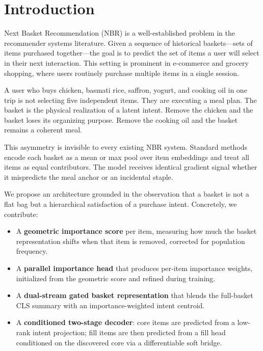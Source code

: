 \documentclass[conference]{IEEEtran}
\begin{document}
\section{Introduction}
Next Basket Recommendation (NBR) is a well-established problem in the recommender systems literature. Given a sequence of historical baskets---sets of items purchased together---the goal is to predict the set of items a user will select in their next interaction. This setting is prominent in e-commerce and grocery shopping, where users routinely purchase multiple items in a single session.

A user who buys chicken, basmati rice, saffron, yogurt, and cooking oil
in one trip is not selecting five independent items. They are executing
a meal plan. The basket is the physical realization of a latent intent.
Remove the chicken and the basket loses its organizing purpose. Remove
the cooking oil and the basket remains a coherent meal.

This asymmetry is invisible to every existing NBR system. Standard methods encode each basket as a mean or max pool over item embeddings and treat all items as equal contributors. The model receives identical gradient signal whether it mispredicts the meal anchor or an incidental staple.

We propose an architecture grounded in the observation that a basket is
not a flat bag but a hierarchical satisfaction of a purchase intent.
Concretely, we contribute:
\begin{itemize}
\item A \textbf{geometric importance score} per item, measuring how much
  the basket representation shifts when that item is removed, corrected
  for population frequency.
\item A \textbf{parallel importance head} that produces per-item importance weights, initialized from the geometric score and refined during training.
\item A \textbf{dual-stream gated basket representation} that blends the
  full-basket CLS summary with an importance-weighted intent centroid.
\item A \textbf{conditioned two-stage decoder}: core items are predicted
  from a low-rank intent projection; fill items are
  then predicted from a fill head conditioned on the discovered core via a differentiable soft bridge.
\end{itemize}


\end{document}
